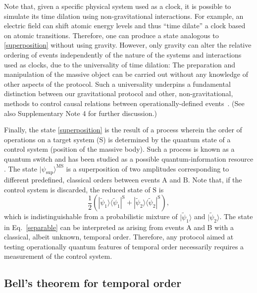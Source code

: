 \documentclass[a4paper,11pt]{article}
\newcommand{\bra}{\langle}
\newcommand{\ket}{\rangle}
\begin{document}
{Note that, given a specific physical system used as a clock, it is possible to simulate its time dilation using non-gravitational interactions. For example, an electric field can shift atomic energy levels and thus ``time dilate'' a clock based on atomic transitions. Therefore, one can produce a state analogous to \eqref{superposition} without using gravity. However, only gravity can alter the relative ordering of events independently of the nature of the systems and interactions used as clocks, due to the universality of time dilation: The preparation and manipulation of the massive object can be carried out without any knowledge of other aspects of the protocol. Such a universality underpins a fundamental distinction between our gravitational protocol and other, non-gravitational, methods to control causal relations between operationally-defined events~\cite{procopio_experimental_2014, Rubinoe1602589, rubino2017experimental, Goswami2018, goswami2018communicating, Wei2019, guo2018experimental}. (See also Supplementary Note 4 for further discussion.)} 

{Finally, the} state \eqref{superposition} is the result of a process wherein the order of operations on a target system (S) is determined by the quantum state of a control system (position of the massive body). {Such a process} is known as a {quantum switch} \cite{Chiribella:2013} and has been studied as a possible quantum-information resource \cite{Chiribella:2012, Colnaghi:2012, Araujo:2014, feixquantum2015, guerin16}. The state $|\psi_{\textrm{sup}}\ket^{\mathrm{MS}}$ is a superposition of two amplitudes corresponding to different {predefined, classical} orders between events $\mathrm A$ and $\mathrm B$.
Note that, if the control system is discarded, the reduced state of $\mathrm S$ is
\begin{equation}
\frac{1}{2}\left(|\widetilde{\psi}_1\ket\bra \widetilde{\psi}_1|^\mathrm{S} + |\widetilde{\psi}_2\ket\bra \widetilde{\psi}_2|^\mathrm{S}\right),
\label{separable}
\end{equation}
which is indistinguishable from a {probabilistic mixture} of $|\widetilde{\psi}_1\ket$ and $|\widetilde{\psi}_2\ket$. The state in  Eq.\ \eqref{separable} can be interpreted as arising from events A and B with a classical, albeit unknown, temporal order. Therefore, any protocol aimed at testing operationally quantum features of temporal order necessarily requires a measurement of the control system.


\subsection*{Bell's theorem for temporal order}
\end{document}
